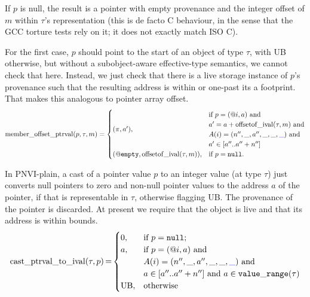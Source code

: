 \documentclass[acmsmall,review,screen]{acmart}\settopmatter{printfolios=true,printccs=false,printacmref=false}
\makeatletter
\newcommand{\myparagraph}[1]{\vspace{0.5\baselineskip}\par\noindent{\normalsize\bfseries{#1}}\quad}
\DeclareMathOperator{\intcastPtr}{cast\_ptrval\_to\_ival} %
\DeclareMathOperator{\offsetofIval}{offsetof\_ival}
\DeclareMathOperator{\memberOffset}{member\_offset\_ptrval}
\newcommand{\Null}{\mathtt{null}} %
\newcommand{\provNone}{@\mathtt{empty}}
\makeatother
\begin{document}
If $p$ is null, the result is a pointer with empty provenance and the
        integer offset of $m$ within $\tau$'s representation
        (this is de facto C behaviour, in the sense that the GCC torture tests rely
        on it; it does not exactly match ISO C).

For the first case, 
$p$ should point to the start of an object of type $\tau$, with UB
otherwise, but without a
subobject-aware effective-type semantics, we cannot check that
here.  Instead, we just check that there is a live storage instance of
$p$'s provenance such that the resulting address is within or one-past
its 
a footprint. That makes this analogous to pointer
array offset. 
\[
    \memberOffset(p, \tau, m) =
    \begin{cases}
      (\pi, a'),
& \begin{array}{@{}l@{}}
\text{if } p = (@i, a)   \text{ and}\\
a'=a + \offsetofIval(\tau, m) \text{ and}\\
A(i) = (n'', \_, a'', \_, \_, \myt{\_}) \text{ and}\\
a'\in [a''..a''+n'']
\end{array}\\
      (\provNone,\offsetofIval(\tau, m)),
        &\text{if $p = \Null$.}
    \end{cases}
\]



%
%

\myparagraph{Casts (PNVI-plain)}
In PNVI-plain, a cast of a pointer value $p$  to an integer value (at type $\tau$)
just converts null pointers to zero and non-null pointer values to the
address $a$ of the pointer, if that is representable in $\tau$,
otherwise flagging UB.  The provenance of the pointer is discarded.
At present we require that the object is live and that its address is
within bounds. 
\[ \begin{array}{@{}r@{\,}c@{\,}l@{}}
\intcastPtr(\tau, p) &=&
    \begin{cases}
       0,
        &\text{if } p = \Null; \\
       a,
& \begin{array}[t]{@{}l@{}}
\text{if } p = (@i, a)   \text{ and}\\
A(i) = (n'', \_, a'', \_, \_, \myt{\_}) \text{ and}\\
a\in [a''..a''+n''] \text{ and } a \in \mathtt{value\_range}(\tau) \\
\end{array}\\
      \text{UB},
        &\text{otherwise}
    \end{cases}
\end{array}
\]
\end{document}
